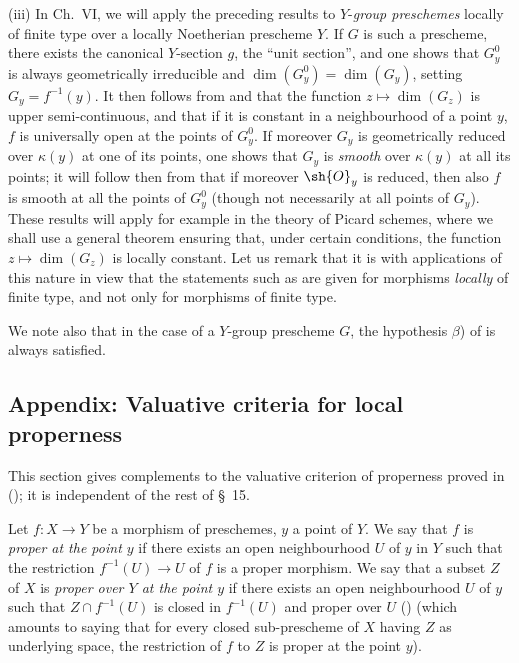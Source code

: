 \begin{remarks}[15.6.10]
(iii)
In Ch.\ VI, we will apply the preceding results to $Y$-\emph{group preschemes} locally of finite type over a locally Noetherian prescheme $Y$.
If $G$ is such a prescheme, there exists the canonical $Y$-section $g$, the ``unit section'', and one shows that $G_y^0$ is always geometrically irreducible and $\dim(G_y^0)=\dim(G_y)$, setting $G_y=f^{-1}(y)$.
It then follows from  and  that the function $z\mapsto\dim(G_z)$ is upper semi-continuous, and that if it is constant in a neighbourhood of a point $y$, $f$ is universally open at the points of $G_y^0$.
If moreover $G_y$ is geometrically reduced over $\kappa(y)$ at one of its points, one shows that $G_y$ is \emph{smooth}  over $\kappa(y)$ at all its points; it will follow then from  that if moreover $\sh{O}_y$ is reduced, then also $f$ is smooth at all the points of $G_y^0$ (though not necessarily at all points of $G_y$).
These results will apply for example in the theory of Picard schemes, where we shall use a general theorem ensuring that, under certain conditions, the function $z\mapsto\dim(G_z)$ is locally constant.
Let us remark that it is with applications of this nature in view that the statements such as  are given for morphisms \emph{locally} of finite type, and not only for morphisms of finite type.

We note also that in the case of a $Y$-group prescheme $G$, the hypothesis $\beta$) of  is always satisfied.
\end{remarks}


\subsection{Appendix: Valuative criteria for local properness}
\label{subsection:IV.15.7}

This section gives complements to the valuative criterion of properness proved in (); it is independent of the rest of \S~15.

\begin{definition}[15.7.1]
\label{IV.15.7.1}
Let $f:X\to Y$ be a morphism of preschemes, $y$ a point of $Y$.
We say that $f$ is \emph{proper at the point $y$} if there exists an open neighbourhood $U$ of $y$ in $Y$ such that the restriction $f^{-1}(U)\to U$ of $f$ is a proper morphism.
We say that a subset $Z$ of $X$ is \emph{proper over $Y$ at the point $y$} if there exists an open neighbourhood $U$ of $y$ such that $Z\cap f^{-1}(U)$ is closed in $f^{-1}(U)$ and proper over $U$ () (which amounts to saying that for every closed sub-prescheme of $X$ having $Z$ as underlying space, the restriction of $f$ to $Z$ is proper at the point $y$).
\end{definition}

